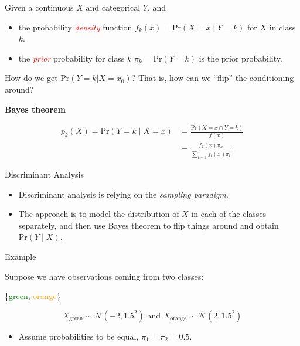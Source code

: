 \documentclass[10pt,ignorenonframetext,]{beamer}
\providecommand{\tightlist}{%
  \setlength{\itemsep}{0pt}\setlength{\parskip}{0pt}}
\begin{document}
\begin{frame}

Given a continuous \(X\) and categorical \(Y\), and

\begin{itemize}
\tightlist
\item
  the probability \emph{\textcolor{red}{density}} function
  \(f_k(x) = \text{Pr}(X=x \mid Y=k)\) for \(X\) in class \(k\).
\item
  the \emph{\textcolor{red}{prior}} probability for class \(k\)
  \(\pi_k = \text{Pr}(Y=k)\) is the prior probability.
\end{itemize}

How do we get \(\text{Pr}(Y=k | X=x_0)\)? That is, how can we ``flip''
the conditioning around? \vspace{4mm}

\begin{block}{\textbf{Bayes theorem}}

\vspace{-3mm}

\begin{align*}
p_k(X) = \text{Pr}(Y=k \mid X= x) &= 
\frac{\text{Pr}(X=x \cap Y=k)}{f(x)}\\
&= \frac{ f_k(x) \pi_k}{\sum_{l=1}^K  f_l(x) \pi_l}  \ .
\end{align*}

\end{block}

\end{frame}

\begin{frame}{Discriminant Analysis}

\vspace{2mm}

\begin{itemize}
\item
  Discriminant analysis is relying on the \emph{sampling paradigm}.
\item
  The approach is to model the distribution of \(X\) in each of the
  classes separately, and then use Bayes theorem to flip things around
  and obtain \(\text{Pr}(Y \mid X)\).
\end{itemize}

\begin{block}{Example}

\vspace{2mm}

Suppose we have observations coming from two classes:

\{\textcolor{green}{green}, \textcolor{orange}{orange}\}

\[X_{\text{green}}\sim \mathcal{N}(-2, 1.5^2) \text{ and }
X_{\text{orange}}\sim \mathcal{N}(2, 1.5^2) \]

\begin{itemize}
\tightlist
\item
  Assume probabilities to be equal, \(\pi_1 = \pi_2 = 0.5\).
\end{itemize}

\end{block}

\end{frame}
\end{document}
